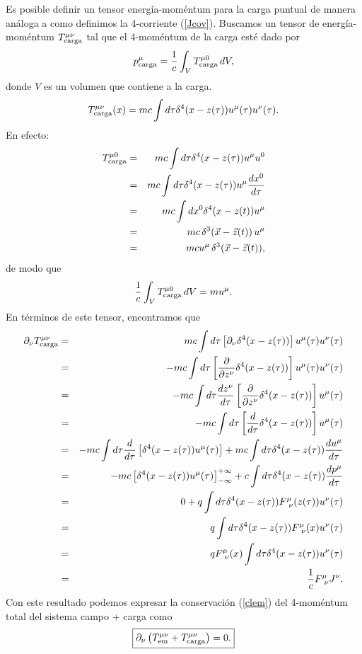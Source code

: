 Es posible definir un tensor energía-moméntum para la carga puntual de manera
análoga a como definimos la 4-corriente (\ref{Jcov}). Buscamos un tensor de
energía-moméntum $T_{\rm carga}^{\mu\nu}$ tal que el 4-moméntum de la carga
esté dado por
\begin{equation}
p^\mu_{\rm carga}=\frac{1}{c}\int_V T_{\rm carga}^{\mu 0}\,dV,
\end{equation}
donde $V$ es un volumen que contiene a la carga.
\begin{equation}
T_{\rm carga}^{\mu\nu}(x)=mc\int d\tau \delta^4(x-z(\tau)) u^\mu(\tau)
u^\nu(\tau).
\end{equation}
En efecto:
\begin{eqnarray}
T_{\rm carga}^{\mu 0}&=&mc\int d\tau \delta^4(x-z(\tau)) u^\mu u^0 \\
&=&mc\int d\tau \delta^4(x-z(\tau)) u^\mu \frac{dx^0}{d\tau} \\
&=&mc\int dx^0 \delta^4(x-z(t)) u^\mu  \\
&=&mc\,\delta^3(\vec{x}-\vec{z}(t))\, u^\mu \\
&=&mc u^\mu \, \delta^3(\vec{x}-\vec{z}(t)),
\end{eqnarray}
de modo que
\begin{equation}
\frac{1}{c}\int_V T_{\rm carga}^{\mu 0}\,dV=m u^\mu.
\end{equation}
En términos de este tensor, encontramos que
\begin{eqnarray}
\partial_\nu T_{\rm carga}^{\mu\nu}&=&mc\int d\tau \left[ \partial_\nu
\delta^4(x-z(\tau))\right]  u^\mu(\tau) u^\nu(\tau) \\
&=&-mc\int d\tau \left[ \frac{\partial}{\partial z^\nu}
\delta^4(x-z(\tau))\right]  u^\mu(\tau)u^\nu(\tau) \\
&=&-mc\int d\tau \frac{dz^\nu}{d\tau}\left[ \frac{\partial}{\partial z^\nu}
\delta^4(x-z(\tau))\right]  u^\mu(\tau)\\
&=&-mc\int d\tau \left[\frac{d}{d\tau}\delta^4(x-z(\tau))\right]  u^\mu(\tau)\\
&=&-mc\int d\tau  \frac{d}{d\tau}\left[\delta^4(x-z(\tau))
u^\mu(\tau)\right]+mc\int d\tau  \delta^4(x-z(\tau)) \frac{du^\mu}{d\tau}\\
&=&-mc\left[\delta^4(x-z(\tau)) u^\mu(\tau)\right]^{+\infty}_{-\infty}+c\int
d\tau  \delta^4(x-z(\tau)) \frac{dp^\mu}{d\tau}\\
&=&0+q\int d\tau  \delta^4(x-z(\tau))F^\mu_{\ \nu}(z(\tau))u^\nu(\tau)\\
&=&q\int d\tau  \delta^4(x-z(\tau))F^\mu_{\ \nu}(x)u^\nu(\tau)\\
&=&qF^\mu_{\ \nu}(x)\int d\tau  \delta^4(x-z(\tau))u^\nu(\tau)\\
&=&\frac{1}{c}F^\mu_{\ \nu}J^\nu.
\end{eqnarray}
Con este resultado podemos expresar la conservación (\ref{clem}) del 4-moméntum
total del sistema campo + carga como
\begin{equation}
\boxed{\partial_\nu \left( T_{\rm em}^{\mu\nu}+T_{\rm carga}^{\mu\nu}\right) =0.}
\label{clem2}
\end{equation}
